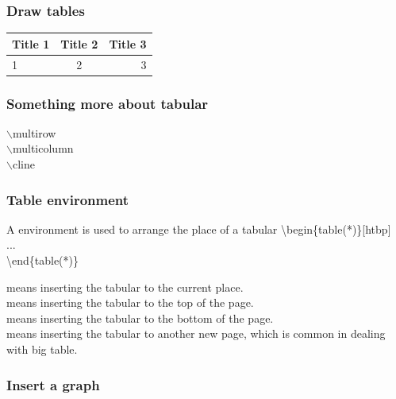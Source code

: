 \begin{frame}
	\frametitle{Draw tables}
    \begin{example}
        \begin{tabular}{|l|c|r|}
        \hline
        Title 1 & Title 2 & Title 3 \\
        \hline
        1 & 2 &3 \\
        \hline
        \end{tabular}
    \end{example}
\end{frame}

\begin{frame}
   \frametitle{Something more about tabular}
   $\backslash$multirow \\
   $\backslash$multicolumn \\
   $\backslash$cline{} \\
\end{frame}

\begin{frame}
	\frametitle{Table environment}
    \begin{definition}
    A  environment is used to arrange the place of a tabular
		{\color{red}\textbackslash begin\{table(*)\}[htbp]}\\
		\quad ...\\
		{\color{red}\textbackslash end\{table(*)\}}\\
	\end{definition}
    \text{[h]} means inserting the tabular to the current place.
    \\\text{[t]} means inserting the tabular to the top of the page.
    \\\text{[b]} means inserting the tabular to the bottom of the page.
    \\\text{[p]} means inserting the tabular to another new page, which is common in dealing with big table.
\end{frame}
\begin{frame}
	\frametitle{Insert a graph}
    
\end{frame}

